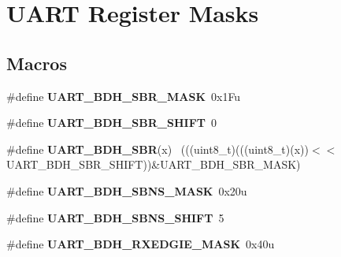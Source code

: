 \hypertarget{group___u_a_r_t___register___masks}{}\section{U\+A\+R\+T Register Masks}
\label{group___u_a_r_t___register___masks}
\subsection*{Macros}
\begin{DoxyCompactItemize}
\item 
\hypertarget{group___u_a_r_t___register___masks_ga2680dc8176b0c933b4a1b77c5dbb64b7}{}\#define {\bfseries U\+A\+R\+T\+\_\+\+B\+D\+H\+\_\+\+S\+B\+R\+\_\+\+M\+A\+S\+K}~0x1\+Fu\label{group___u_a_r_t___register___masks_ga2680dc8176b0c933b4a1b77c5dbb64b7}

\item 
\hypertarget{group___u_a_r_t___register___masks_gac38d8a98be282d97c4837597a6c02cda}{}\#define {\bfseries U\+A\+R\+T\+\_\+\+B\+D\+H\+\_\+\+S\+B\+R\+\_\+\+S\+H\+I\+F\+T}~0\label{group___u_a_r_t___register___masks_gac38d8a98be282d97c4837597a6c02cda}

\item 
\hypertarget{group___u_a_r_t___register___masks_ga28b137858fb0891d9d7e15f3664803c4}{}\#define {\bfseries U\+A\+R\+T\+\_\+\+B\+D\+H\+\_\+\+S\+B\+R}(x)                                                ~(((uint8\+\_\+t)(((uint8\+\_\+t)(x))$<$$<$U\+A\+R\+T\+\_\+\+B\+D\+H\+\_\+\+S\+B\+R\+\_\+\+S\+H\+I\+F\+T))\&U\+A\+R\+T\+\_\+\+B\+D\+H\+\_\+\+S\+B\+R\+\_\+\+M\+A\+S\+K)\label{group___u_a_r_t___register___masks_ga28b137858fb0891d9d7e15f3664803c4}

\item 
\hypertarget{group___u_a_r_t___register___masks_ga727c0ef3199f627c85fc740265d5134d}{}\#define {\bfseries U\+A\+R\+T\+\_\+\+B\+D\+H\+\_\+\+S\+B\+N\+S\+\_\+\+M\+A\+S\+K}~0x20u\label{group___u_a_r_t___register___masks_ga727c0ef3199f627c85fc740265d5134d}

\item 
\hypertarget{group___u_a_r_t___register___masks_ga4d6023b67150b98ef12dba445f773109}{}\#define {\bfseries U\+A\+R\+T\+\_\+\+B\+D\+H\+\_\+\+S\+B\+N\+S\+\_\+\+S\+H\+I\+F\+T}~5\label{group___u_a_r_t___register___masks_ga4d6023b67150b98ef12dba445f773109}

\item 
\hypertarget{group___u_a_r_t___register___masks_ga0882debd8f2c52d4ab8461b22b6519d9}{}\#define {\bfseries U\+A\+R\+T\+\_\+\+B\+D\+H\+\_\+\+R\+X\+E\+D\+G\+I\+E\+\_\+\+M\+A\+S\+K}~0x40u\label{group___u_a_r_t___register___masks_ga0882debd8f2c52d4ab8461b22b6519d9}


\end{DoxyCompactItemize}
